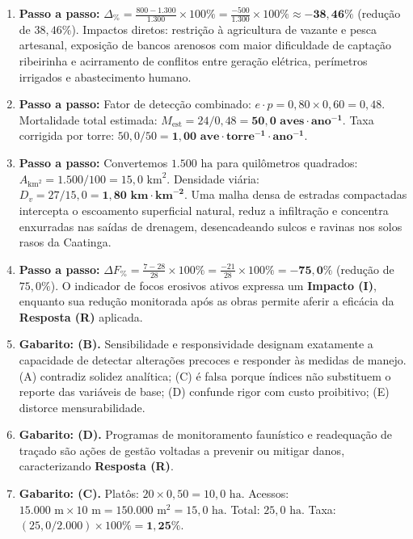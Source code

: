 \begin{boxGabarito}
\begin{enumerate}[leftmargin=1.6em, itemsep=4pt]
  Área total suprimida: $A_{\text{sup}} = 12{,}00 + 9{,}60 + 2{,}40 = \mathbf{24{,}00\text{ ha}}$.
  Taxa de supressão: $T_{\text{sup}} = (24{,}00 / 1.200) \times 100\% = \mathbf{2{,}00\%}$.
  \item \textbf{Passo a passo:}
  $\Delta_{\%} = \frac{800 - 1.300}{1.300} \times 100\% = \frac{-500}{1.300} \times 100\% \approx \mathbf{-38{,}46\%}$ (redução de $38{,}46\%$).
  Impactos diretos: restrição à agricultura de vazante e pesca artesanal, exposição de bancos arenosos com maior dificuldade de captação ribeirinha e acirramento de conflitos entre geração elétrica, perímetros irrigados e abastecimento humano.
  \item \textbf{Passo a passo:}
  Fator de detecção combinado: $e \cdot p = 0{,}80 \times 0{,}60 = 0{,}48$.
  Mortalidade total estimada: $M_{\text{est}} = 24 / 0{,}48 = \mathbf{50{,}0\text{ aves}\cdot\text{ano}^{-1}}$.
  Taxa corrigida por torre: $50{,}0 / 50 = \mathbf{1{,}00\text{ ave}\cdot\text{torre}^{-1}\cdot\text{ano}^{-1}}$.
  \item \textbf{Passo a passo:}
  Convertemos $1.500\text{ ha}$ para quilômetros quadrados: $A_{\text{km}^2} = 1.500 / 100 = 15{,}0\text{ km}^2$.
  Densidade viária: $D_v = 27 / 15{,}0 = \mathbf{1{,}80\text{ km}\cdot\text{km}^{-2}}$.
  Uma malha densa de estradas compactadas intercepta o escoamento superficial natural, reduz a infiltração e concentra enxurradas nas saídas de drenagem, desencadeando sulcos e ravinas nos solos rasos da Caatinga.
  \item \textbf{Passo a passo:}
  $\Delta F_{\%} = \frac{7 - 28}{28} \times 100\% = \frac{-21}{28} \times 100\% = \mathbf{-75{,}0\%}$ (redução de $75{,}0\%$).
  O indicador de focos erosivos ativos expressa um \textbf{Impacto (I)}, enquanto sua redução monitorada após as obras permite aferir a eficácia da \textbf{Resposta (R)} aplicada.
  \item \textbf{Gabarito: (B).} Sensibilidade e responsividade designam exatamente a capacidade de detectar alterações precoces e responder às medidas de manejo. (A) contradiz solidez analítica; (C) é falsa porque índices não substituem o reporte das variáveis de base; (D) confunde rigor com custo proibitivo; (E) distorce mensurabilidade.
  \item \textbf{Gabarito: (D).} Programas de monitoramento faunístico e readequação de traçado são ações de gestão voltadas a prevenir ou mitigar danos, caracterizando \textbf{Resposta (R)}.
  \item \textbf{Gabarito: (C).} Platôs: $20 \times 0{,}50 = 10{,}0\text{ ha}$. Acessos: $15.000\text{ m} \times 10\text{ m} = 150.000\text{ m}^2 = 15{,}0\text{ ha}$. Total: $25{,}0\text{ ha}$. Taxa: $(25{,}0 / 2.000) \times 100\% = \mathbf{1{,}25\%}$.

\end{enumerate}
\end{boxGabarito}
